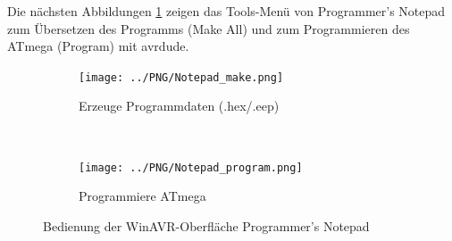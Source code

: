 Die nächsten Abbildungen \ref{fig:WinAVR2} zeigen das Tools-Menü von Programmer's Notepad
zum Übersetzen des Programms (Make All) und zum Programmieren des ATmega (Program) mit avrdude.

\begin{figure}[H]
  \begin{subfigure}[b]{9cm}
    \centering
    \texttt{[image: ../PNG/Notepad\_make.png]}
    \caption{Erzeuge Programmdaten (.hex/.eep)}
  \end{subfigure}
  ~
  \begin{subfigure}[b]{9cm}
    \centering
    \texttt{[image: ../PNG/Notepad\_program.png]}
    \caption{Programmiere ATmega}
  \end{subfigure}
  \caption{Bedienung der WinAVR-Oberfläche Programmer's Notepad}
  \label{fig:WinAVR2}
\end{figure}


